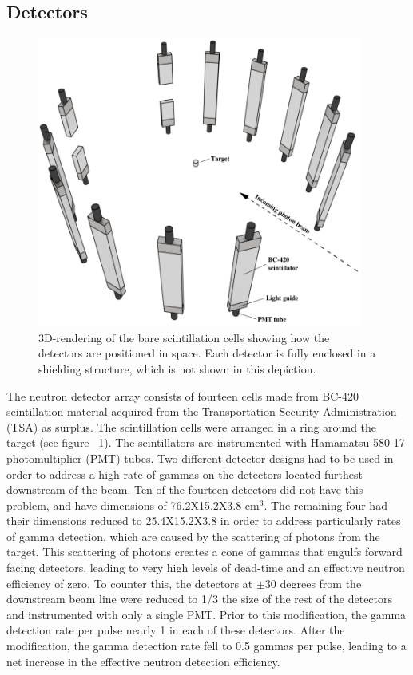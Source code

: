 \subsection{Detectors}
\begin{figure}[h]
\centering
\includegraphics[width=0.95\textwidth]{Content/Methods/Detectors.png}
\caption{3D-rendering of the bare scintillation cells showing how the detectors are positioned in space.
Each detector is fully enclosed in a shielding structure, which is not shown in this depiction.}
\label{fig:DetGeom}
\end{figure}
The neutron detector array consists of fourteen cells made from BC-420 scintillation material acquired from the Transportation Security Administration (TSA) as surplus.
The scintillation cells were arranged in a ring around the target (see figure ~\ref{fig:DetGeom}).
The scintillators are instrumented with Hamamatsu 580-17 photomultiplier (PMT) tubes.
Two different detector designs had to be used in order to address a high rate of gammas on the detectors located furthest downstream of the beam.
Ten of the fourteen detectors did not have this problem, and have dimensions of 76.2X15.2X3.8 cm$^3$.
The remaining four had their dimensions reduced to 25.4X15.2X3.8 in order to address particularly rates of gamma detection, which are caused by the scattering of photons from the target.
This scattering of photons creates a cone of gammas that engulfs forward facing detectors, leading to very high levels of dead-time and an effective neutron efficiency of zero.
To counter this, the detectors at $\pm$30 degrees from the downstream beam line were reduced to 1/3 the size of the rest of the detectors and instrumented with only a single PMT.
Prior to this modification, the gamma detection rate per pulse nearly 1 in each of these detectors.
After the modification, the gamma detection rate fell to 0.5 gammas per pulse, leading to a net increase in the effective neutron detection efficiency.

